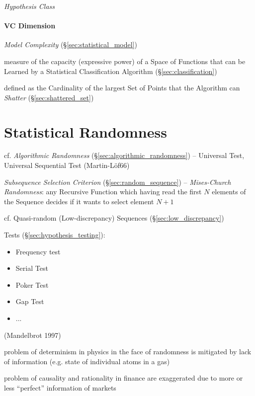 \emph{Hypothesis Class}



\paragraph{VC Dimension}\label{sec:vc_dimension}\hfill

\emph{Model Complexity} (\S\ref{sec:statistical_model})

measure of the capacity (expressive power) of a Space of Functions that can be
Learned by a Statistical Classification Algorithm (\S\ref{sec:classification})

defined as the Cardinality of the largest Set of Points that the Algorithm can
\emph{Shatter} (\S\ref{sec:shattered_set})



\section{Statistical Randomness}\label{sec:statistical_randomness}

cf. \emph{Algorithmic Randomness} (\S\ref{sec:algorithmic_randomness}) --
Universal Test, Universal Sequential Test (Martin-L\"of66)

\emph{Subsequence Selection Criterion} (\S\ref{sec:random_sequence}) --
\emph{Mises-Church Randomness}: any Recursive Function which having read the
first $N$ elements of the Sequence decides if it wants to select element $N+1$

cf. Quasi-random (Low-discrepancy) Sequences (\S\ref{sec:low_discrepancy})

Tests (\S\ref{sec:hypothesis_testing}):
\begin{itemize}
  \item Frequency test
  \item Serial Test
  \item Poker Test
  \item Gap Test
  \item ...
\end{itemize}

(Mandelbrot 1997)

problem of determinism in physics in the face of randomness is mitigated by lack
of information (e.g. state of individual atoms in a gas)

problem of causality and rationality in finance are exaggerated due to more or
less ``perfect'' information of markets


